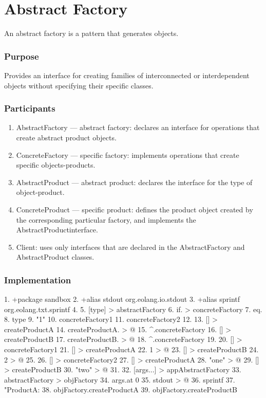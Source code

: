 \documentclass[12pt]{book}
\begin{document}
\section{Abstract Factory}
An abstract factory is a pattern that generates objects.

\subsubsection{Purpose}
Provides an interface for creating families of interconnected or interdependent objects without specifying their specific classes.

\subsubsection{Participants}
\begin{enumerate}
    \item AbstractFactory — abstract factory: declares an interface for operations that create abstract product objects.
    \item ConcreteFactory — specific factory: implements operations that create specific objects-products.
    \item AbstractProduct — abstract product: declares the interface for the type of object-product.
    \item ConcreteProduct — specific product: defines the product object created by the corresponding particular factory, and implements the AbstractProductinterface.
    \item Client: uses only interfaces that are declared in the AbstractFactory and  AbstractProduct classes.
\end{enumerate}

\subsubsection{Implementation}
\begin{ffcode}
1.	+package sandbox
2.	+alias stdout org.eolang.io.stdout
3.	+alias sprintf org.eolang.txt.sprintf
4.	
5.	[type] > abstractFactory
6.	  if. > concreteFactory
7.	    eq.
8.	      type
9.	      "1"
10.	    concreteFactory1
11.	    concreteFactory2
12.	
13.	  [] > createProductA
14.	    createProductA. > @
15.	      ^.concreteFactory
16.	  [] > createProductB
17.	    createProductB. > @
18.	      ^.concreteFactory
19.	
20.	[] > concreteFactory1
21.	  [] > createProductA
22.	    1 > @
23.	  [] > createProductB
24.	    2 > @
25.	
26.	[] > concreteFactory2
27.	  [] > createProductA
28.	    "one" > @
29.	  [] > createProductB
30.	    "two" > @
31.	
32.	[args...] > appAbstractFactory
33.	  abstractFactory > objFactory
34.	    args.at 0
35.	  stdout > @
36.	    sprintf
37.	      "ProductA: %
38.	      objFactory.createProductA
39.	      objFactory.createProductB 

\end{ffcode}
\end{document}
